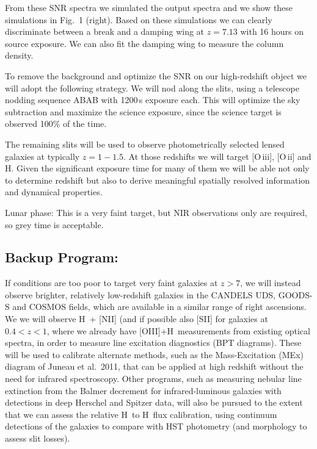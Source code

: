 \documentclass[letter,12pt]{article}
\newcommand{\oii}{O\,{\sc ii}}
\newcommand{\oiii}{O\,{\sc iii}}
\begin{document}
From these SNR spectra we simulated the output spectra and we show these
simulations in Fig.~1 (right). Based on these simulations we can clearly
discriminate between a break and a damping wing at \(z=7.13\) with 16 hours on
source exposure. We can also fit the damping wing to measure the column density.

To remove the background and optimize the SNR on our high-redshift object we
will adopt the following strategy. We will nod along the slits, using a
telescope nodding sequence ABAB with 1200\,s exposure each. This will optimize
the sky subtraction and maximize the science exposure, since the science target
is observed 100\% of the time.

The remaining slits will be used to observe photometrically selected lensed
galaxies at typically \(z=1 - 1.5\). At those redshifts we will target [\oiii],
[\oii] and H\textbeta. Given the significant exposure time for many of them we
will be able not only to determine redshift but also to derive meaningful
spatially resolved information and dynamical properties.

Lunar phase: This is a very faint target, but NIR observations only are
required, so grey time is acceptable.

\subsection{Backup Program:}

If conditions are too poor to target very faint galaxies at \(z > 7\), we will
instead observe brighter, relatively low-redshift galaxies in the CANDELS UDS,
GOODS-S and COSMOS fields, which are available in a similar range of right
ascensions.   We we will observe  H\textalpha\ + [NII] (and if possible also
[SII] for galaxies at \(0.4 < z < 1\), where we already  have [OIII]+H\textbeta\
measurements from existing optical spectra, in order to measure line  excitation
diagnostics (BPT diagrams).   These will be used to calibrate alternate methods,
such as the Mass-Excitation (MEx) diagram of Juneau et al.\ 2011, that can be
applied at high redshift without the need for infrared spectroscopy.  Other
programs, such as measuring nebular line extinction from the Balmer decrement
for infrared-luminous galaxies with detections in deep Herschel and Spitzer
data, will also be pursued to the extent that we can assess the relative
H\textalpha\ to H\textbeta\ flux calibration, using continuum detections of the
galaxies to compare with HST photometry (and morphology to assess slit losses).
\end{document}
